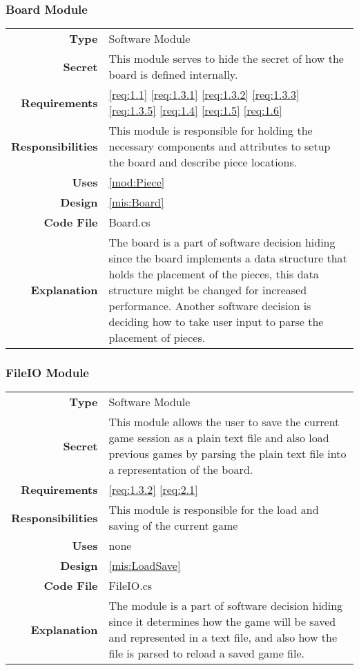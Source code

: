 \documentclass[10pt]{article}
\makeatletter
\newcommand{\CustomLabel}[1]{\Hy@raisedlink{\hypertarget{#1}{}}\label{#1}}
\makeatother
\begin{document}
    \subsubsection{Board Module}\CustomLabel{mod:Board}
        \begin{tabularx}{\linewidth}{ >{\bfseries}r X }
            Type            & Software Module \\
            Secret          & This module serves to hide the secret of how the board is defined internally. \\
	        Requirements	& \ref{req:1.1} \ref{req:1.3.1} \ref{req:1.3.2} \ref{req:1.3.3} \ref{req:1.3.5} \ref{req:1.4} \ref{req:1.5} \ref{req:1.6}\\            
            Responsibilities & This module is responsible for holding the necessary components and attributes to setup the board and describe piece locations. \\
            Uses            & \ref{mod:Piece} \\
            Design          & \ref{mis:Board} \\
            Code File       & Board.cs \\
            Explanation     & The board is a part of software decision hiding since the board implements a data structure that holds the placement of the pieces, this data structure might be changed for increased performance. Another software decision is deciding how to take user input to parse the placement of pieces. \\
        \end{tabularx}

   
    \subsubsection{FileIO Module}\CustomLabel{mod:LoadSave}
        \begin{tabularx}{\linewidth}{ >{\bfseries}r X }
            Type            & Software Module \\
            Secret          & This module allows the user to save the current game session as a plain text file and also load previous games by parsing the plain text file into a representation of the board. \\
            Requirements & \ref{req:1.3.2} \ref{req:2.1} \\
            Responsibilities & This module is responsible for the load and saving of the current game  \\
            Uses            & none \\
            Design          & \ref{mis:LoadSave} \\
            Code File       & FileIO.cs \\
            Explanation     & The module is a part of software decision hiding since it determines how the game will be saved and represented in a text file, and also how the file is parsed to reload a saved game file. \\
        \end{tabularx}  
        
\end{document}
